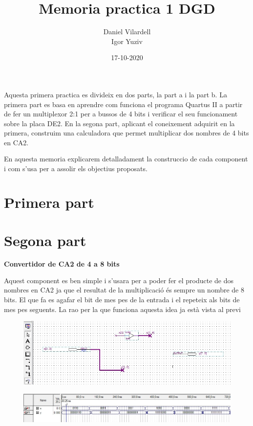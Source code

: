 \documentclass[12pt, a4papre]{article}
\author{Daniel Vilardell\\
	   Igor Yuziv}
\title{Memoria practica 1 DGD}
\date{17-10-2020}
\begin{document}
	\maketitle
	Aquesta primera practica es divideix en dos parts, la part a i la part b. La primera part es basa en aprendre com funciona el programa Quartus II a partir de fer un multiplexor  2:1 per a bussos de 4 bits i verificar el seu funcionament sobre la placa DE2. En la segona part, aplicant el coneixement adquirit en la primera, construim una calculadora que permet multiplicar dos nombres de 4 bits en CA2.
	
	En aquesta memoria explicarem detalladament la construccio de cada component i com s'usa per a assolir els objectius proposats.

	\newpage
	\section{Primera part}
	
	\newpage
	\section{Segona part}
	\textbf{\large{Convertidor de CA2 de 4 a 8 bits}}
	
	Aquest component es ben simple i s'usara per a poder fer el producte de dos nombres en CA2 ja que el resultat de la multiplicació és sempre un nombre de 8 bits. El que fa es agafar el bit de mes pes de la entrada i el repeteix als bits de mes pes seguents. La rao per la que funciona aquesta idea ja està vista al previ
	
	\begin{figure}[H]
		\begin{center}
		\includegraphics[width=150mm]{CA2_4_a_8.jpeg}
		\end{center}
	\end{figure}
	\begin{figure}[H]
		\begin{center}
		\includegraphics[width=150mm]{CA2_4A8simul.jpeg}
		\end{center}
	\end{figure}
	
\end{document}
